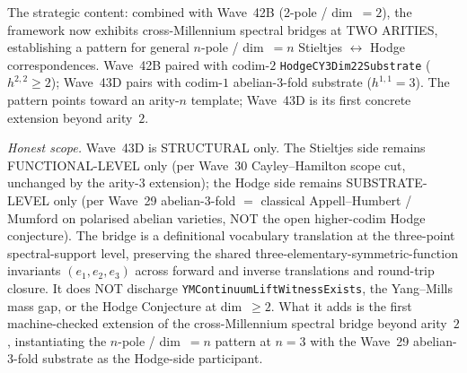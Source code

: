 \begin{remark}
\begin{itemize}
\end{itemize}
The strategic content: combined with Wave~42B (2-pole / dim~$=2$), the framework now exhibits cross-Millennium spectral bridges at TWO ARITIES, establishing a pattern for general $n$-pole / dim~$=n$ Stieltjes $\leftrightarrow$ Hodge correspondences. Wave~42B paired with codim-$2$ \texttt{HodgeCY3Dim22Substrate} ($h^{2,2} \geq 2$); Wave~43D pairs with codim-$1$ abelian-3-fold substrate ($h^{1,1} = 3$). The pattern points toward an arity-$n$ template; Wave~43D is its first concrete extension beyond arity~$2$.

\emph{Honest scope.} Wave~43D is STRUCTURAL only. The Stieltjes side remains FUNCTIONAL-LEVEL only (per Wave~30 Cayley--Hamilton scope cut, unchanged by the arity-$3$ extension); the Hodge side remains SUBSTRATE-LEVEL only (per Wave~29 abelian-3-fold $=$ classical Appell--Humbert / Mumford on polarised abelian varieties, NOT the open higher-codim Hodge conjecture). The bridge is a definitional vocabulary translation at the three-point spectral-support level, preserving the shared three-elementary-symmetric-function invariants $(e_1, e_2, e_3)$ across forward and inverse translations and round-trip closure. It does NOT discharge \texttt{YMContinuumLiftWitnessExists}, the Yang--Mills mass gap, or the Hodge Conjecture at dim~$\geq 2$. What it adds is the first machine-checked extension of the cross-Millennium spectral bridge beyond arity~$2$, instantiating the $n$-pole / dim~$=n$ pattern at $n = 3$ with the Wave~29 abelian-3-fold substrate as the Hodge-side participant.
\end{remark}

